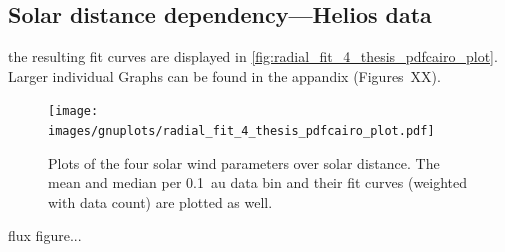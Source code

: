 \subsection{Solar distance dependency---Helios data}
the resulting fit curves are displayed in \autoref{fig:radial_fit_4_thesis_pdfcairo_plot}. Larger individual Graphs can be found in the appandix (Figures~XX).%
\begin{figure}[htb]
	\centering
	\texttt{[image: images/gnuplots/radial\_fit\_4\_thesis\_pdfcairo\_plot.pdf]}
	\caption{Plots of the four solar wind parameters over solar distance. The mean and median per 0.1~au data bin and their fit curves (weighted with data count) are plotted as well.}
	\label{fig:radial_fit_4_thesis_pdfcairo_plot}
\end{figure}

flux figure...\\


